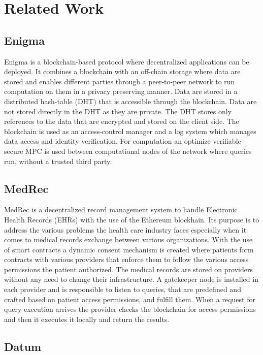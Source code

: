 \chapter{Related Work}
\label{related_work}

\section{Enigma}
\label{rel_work:enigma}

Enigma is a blockchain-based protocol where decentralized applications can be deployed. It combines a blockchain with an off-chain storage where data are stored and enables different parties through a peer-to-peer network to run computation on them in a privacy preserving manner. Data are stored in a distributed hash-table (DHT) that is accessible through the blockchain. Data are not stored directly in the DHT as they are private. The DHT stores only references to the data that are encrypted and stored on the client side. The blockchain is used as an access-control manager and a log system which manages data access and identity verification. For computation an optimize verifiable secure MPC is used between computational nodes of the network where queries run, without a trusted third party.

\section{MedRec}
\label{rel_work:medrec}

MedRec is a decentralized record management system to handle Electronic Health Records (EHRs) with the use of the Ethereum blockhain. Its purpose is to address the various problems the health care industry faces especially when it comes to medical records exchange between various organizations. With the use of smart contracts a dynamic consent mechanism is created where patients form contracts with various providers that enforce them to follow the various access permissions the patient authorized. The medical records are stored on providers without any need to change their infrastructure. A gatekeeper node is installed in each provider and is responsible to listen to queries, that are predefined and crafted based on patient access permissions, and fulfill them. When a request for query execution arrives the provider checks the blockchain for access permissions and then it executes it locally and return the results.

\section{Datum}
\label{rel_work:datum}

